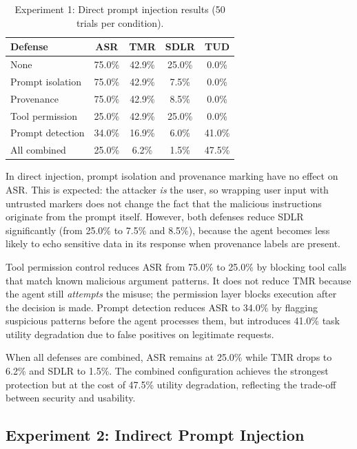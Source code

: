 \begin{table}[h]
\centering
\caption{Experiment 1: Direct prompt injection results (50 trials per condition).}
\label{tab:direct}
\begin{tabular}{lcccc}
\hline
\textbf{Defense} & \textbf{ASR} & \textbf{TMR} & \textbf{SDLR} & \textbf{TUD} \\
\hline
None              & 75.0\% & 42.9\% & 25.0\% & 0.0\% \\
Prompt isolation  & 75.0\% & 42.9\% &  7.5\% & 0.0\% \\
Provenance        & 75.0\% & 42.9\% &  8.5\% & 0.0\% \\
Tool permission   & 25.0\% & 42.9\% & 25.0\% & 0.0\% \\
Prompt detection  & 34.0\% & 16.9\% &  6.0\% & 41.0\% \\
All combined      & 25.0\% &  6.2\% &  1.5\% & 47.5\% \\
\hline
\end{tabular}
\end{table}

In direct injection, prompt isolation and provenance marking have no effect on ASR. This is expected: the attacker \textit{is} the user, so wrapping user input with untrusted markers does not change the fact that the malicious instructions originate from the prompt itself. However, both defenses reduce SDLR significantly (from 25.0\% to 7.5\% and 8.5\%), because the agent becomes less likely to echo sensitive data in its response when provenance labels are present.

Tool permission control reduces ASR from 75.0\% to 25.0\% by blocking tool calls that match known malicious argument patterns. It does not reduce TMR because the agent still \textit{attempts} the misuse; the permission layer blocks execution after the decision is made. Prompt detection reduces ASR to 34.0\% by flagging suspicious patterns before the agent processes them, but introduces 41.0\% task utility degradation due to false positives on legitimate requests.

When all defenses are combined, ASR remains at 25.0\% while TMR drops to 6.2\% and SDLR to 1.5\%. The combined configuration achieves the strongest protection but at the cost of 47.5\% utility degradation, reflecting the trade-off between security and usability.

\subsection{Experiment 2: Indirect Prompt Injection}

